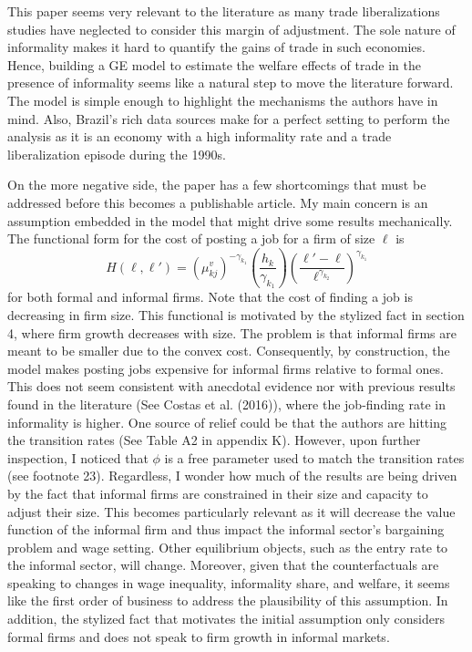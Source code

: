 \documentclass[12pt,oneside,reqno]{amsart}
\begin{document}
This paper seems very relevant to the literature as many trade liberalizations studies have neglected to consider this margin of adjustment. The sole nature of informality makes it hard to quantify the gains of trade in such economies. Hence, building a GE model to estimate the welfare effects of trade in the presence of informality seems like a natural step to move the literature forward. The model is simple enough to highlight the mechanisms the authors have in mind. Also, Brazil's rich data sources make for a perfect setting to perform the analysis as it is an economy with a high informality rate and a trade liberalization episode during the 1990s. 

On the more negative side, the paper has a few shortcomings that must be addressed before this becomes a publishable article. My main concern is an assumption embedded in the model that might drive some results mechanically. The functional form for the cost of posting a job for a firm of size $\ell$ is 
\begin{equation*}
    H(\ell,\ell') = \left(\mu_{kj}^v\right)^{-\gamma_{k_1}}\left(\frac{h_k}{\gamma_{k_1}}\right)\left(\frac{\ell'-\ell}{\ell^{\gamma_{k_2}}}\right)^{\gamma_{k_1}}
\end{equation*}
for both formal and informal firms. Note that the cost of finding a job is decreasing in firm size. This functional is motivated by the stylized fact in section 4, where firm growth decreases with size. The problem is that informal firms are meant to be smaller due to the convex cost. Consequently, by construction, the model makes posting jobs expensive for informal firms relative to formal ones. This does not seem consistent with anecdotal evidence nor with previous results found in the literature (See Costas et al. (2016)), where the job-finding rate in informality is higher. One source of relief could be that the authors are hitting the transition rates (See Table A2 in appendix K). However, upon further inspection, I noticed that $\phi$ is a free parameter used to match the transition rates (see footnote 23). Regardless, I wonder how much of the results are being driven by the fact that informal firms are constrained in their size and capacity to adjust their size. This becomes particularly relevant as it will decrease the value function of the informal firm and thus impact the informal sector's bargaining problem and wage setting. Other equilibrium objects, such as the entry rate to the informal sector, will change. Moreover, given that the counterfactuals are speaking to changes in wage inequality, informality share,  and welfare, it seems like the first order of business to address the plausibility of this assumption. In addition, the stylized fact that motivates the initial assumption only considers formal firms and does not speak to firm growth in informal markets. 
\end{document}
